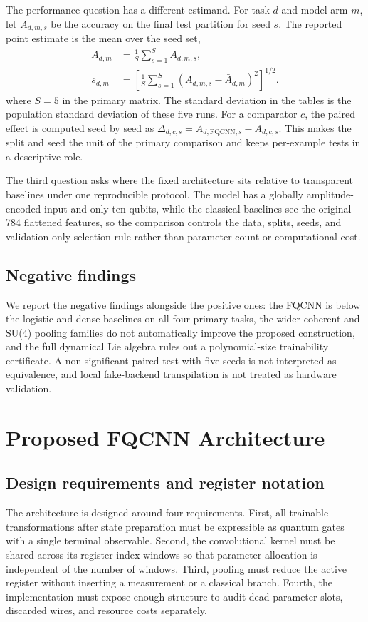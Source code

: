 \documentclass[conference]{IEEEtran}
\begin{document}
The performance question has a different estimand. For task $d$ and model arm
$m$, let $A_{d,m,s}$ be the accuracy on the final test partition for seed $s$.
The reported point estimate is the mean over the seed set,
\begin{equation}
\begin{aligned}
\bar{A}_{d,m}&=\frac{1}{S}\sum_{s=1}^{S}A_{d,m,s},\\
s_{d,m}&=\left[\frac{1}{S}\sum_{s=1}^{S}
\left(A_{d,m,s}-\bar{A}_{d,m}\right)^2\right]^{1/2}.
\end{aligned}
\label{eq:seedestimand}
\end{equation}
where $S=5$ in the primary matrix. The standard deviation in the tables is the
population standard deviation of these five runs.
For a comparator $c$, the paired effect is computed seed by seed as
$\Delta_{d,c,s}=A_{d,\mathrm{FQCNN},s}-A_{d,c,s}$. This makes the split and seed
the unit of the primary comparison and keeps per-example tests in a descriptive
role.

The third question asks where the fixed architecture sits relative to transparent baselines under one reproducible protocol. The model has a globally amplitude-encoded input and only ten qubits, while the classical baselines see the original 784 flattened features, so the comparison controls the data, splits, seeds, and validation-only selection rule rather than parameter count or computational cost.

\subsection{Negative findings}
We report the negative findings alongside the positive ones: the FQCNN is below
the logistic and dense baselines on all four primary tasks, the wider coherent
and SU(4) pooling families do not automatically improve the proposed
construction, and the full dynamical Lie algebra rules out a polynomial-size
trainability certificate. A non-significant paired test with five seeds is not
interpreted as equivalence, and local fake-backend transpilation is not treated
as hardware validation.

\section{Proposed FQCNN Architecture}
\subsection{Design requirements and register notation}
The architecture is designed around four requirements. First, all trainable
transformations after state preparation must be expressible as quantum gates
with a single terminal observable. Second, the convolutional kernel must be
shared across its register-index windows so that parameter allocation is
independent of the number of windows. Third, pooling must reduce the active
register without inserting a measurement or a classical branch. Fourth, the
implementation must expose enough structure to audit dead parameter slots,
discarded wires, and resource costs separately.
\end{document}
